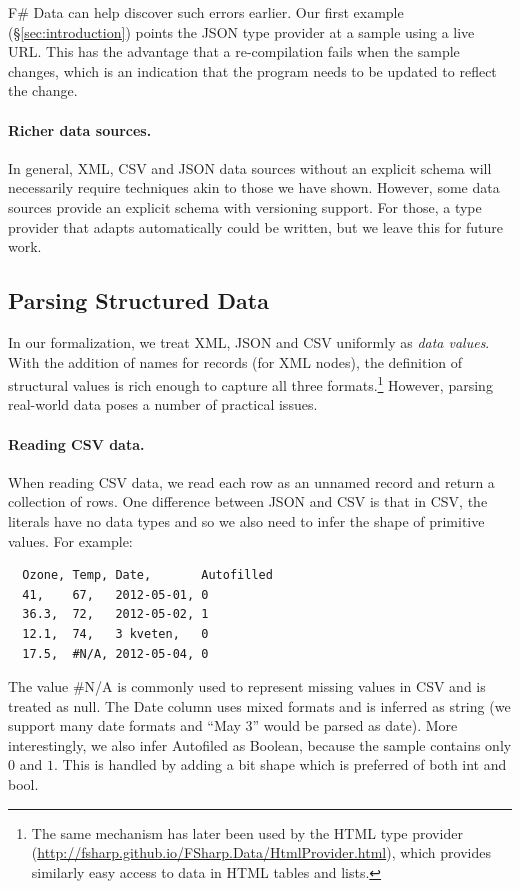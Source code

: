 \documentclass[pldi-cameraready]{sigplanconf-pldi16}
\newcommand{\kvd}[1]{\textnormal{\textcolor{kvdclr}{\sffamily #1}}}
\newcommand{\ident}[1]{\textnormal{\sffamily #1}}
\begin{document}
F\# Data can help discover such errors earlier. Our first example (\S\ref{sec:introduction})
points the JSON type provider at a sample using a live URL. This has the advantage that a
re-compilation fails when the sample changes, which is an indication that the program needs to be
updated to reflect the change.

\paragraph{Richer data sources.}
In general, XML, CSV and JSON data sources without an explicit schema will necessarily require
techniques akin to those we have shown. However, some data sources provide an explicit schema with
versioning support. For those, a type provider that adapts automatically could be written,
but we leave this for future work.


\subsection{Parsing Structured Data}
\label{sec:impl-parsing}

In our formalization, we treat XML, JSON and CSV uniformly as \emph{data values}. With the addition of
names for records (for XML nodes), the definition of structural values is rich enough to capture all
three formats.\footnote{The same mechanism has later been used by the HTML type provider
(\url{http://fsharp.github.io/FSharp.Data/HtmlProvider.html}), which provides similarly easy
access to data in HTML tables and lists.} However, parsing real-world data poses a number of practical issues.

\paragraph{Reading CSV data.}
When reading CSV data, we read each row as an unnamed record and return a collection of rows.
One difference between JSON and CSV is that in CSV, the literals have no data types and so
we also need to infer the shape of primitive values. For example:
%
{\small{
\begin{verbatim}
  Ozone, Temp, Date,       Autofilled
  41,    67,   2012-05-01, 0
  36.3,  72,   2012-05-02, 1
  12.1,  74,   3 kveten,   0
  17.5,  #N/A, 2012-05-04, 0
\end{verbatim}
}}
%
\noindent
The value {\small\ttfamily \#N/A} is commonly used to represent missing values in CSV and is treated
as \kvd{null}. The \ident{Date} column uses mixed formats and is inferred as \ident{string}
(we support many date formats and ``May 3'' would be parsed as date). More interestingly,
we also infer \ident{Autofiled} as Boolean, because the sample contains only $0$ and $1$.
This is handled by adding a \ident{bit} shape which is preferred of both \ident{int} and \ident{bool}.
\end{document}
